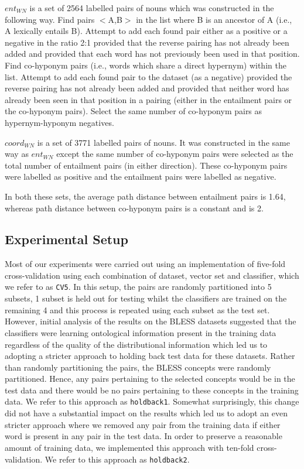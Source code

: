 \documentclass[11pt]{article}
\begin{document}
$ent_{WN}$ is a set of 2564 labelled pairs of nouns which was constructed in the following way.  Find pairs $<$A,B$>$ in the list where B is an ancestor of A (i.e., A lexically entails B).  Attempt to add each found pair either as a positive or a negative in the ratio 2:1 provided that the reverse pairing has not already been added and provided that each word has not previously been used in that position.  Find co-hyponym pairs (i.e., words which share a direct hypernym) within the list.  Attempt to add each found pair to the dataset (as a negative) provided the reverse pairing has not already been added and provided that neither word has already been seen in that position in a pairing (either in the entailment pairs or the co-hyponym pairs).  Select the same number of co-hyponym pairs as hypernym-hyponym negatives. 

$coord_{WN}$ is a set of 3771 labelled pairs of nouns.  It was constructed in the same way as $ent_{WN}$ except the same number of co-hyponym pairs were selected as the total number of entailment pairs (in either direction).  These co-hyponym pairs were labelled as positive and the entailment pairs were labelled as negative.

In both these sets, the average path distance between entailment pairs is 1.64, whereas path distance between co-hyponym pairs is a constant and is 2.

\subsection{Experimental Setup}

Most of our experiments were carried out using an implementation of five-fold cross-validation using each combination of dataset, vector set and classifier, which we refer to as \texttt{CV5}.  In this setup, the pairs are randomly partitioned into 5 subsets, 1 subset is held out for testing whilst the classifiers are trained on the remaining 4 and this process is repeated using each subset as the test set.  However, initial analysis of the results on the BLESS datasets suggested that the classifiers were learning ontological information present in the training data regardless of the quality of the distributional information which led us to adopting a stricter approach to holding back test data for these datasets.  Rather than randomly partitioning the pairs, the BLESS concepts were randomly partitioned.  Hence, any pairs pertaining to the selected concepts would be in the test data and there would be no pairs pertaining to these concepts in the training data.  We refer to this approach as \texttt{holdback1}.  Somewhat surprisingly, this change did not have a substantial impact on the results which led us to adopt an even stricter approach where we removed any pair from the training data if either word is present in any pair in the test data.  In order to preserve a reasonable amount of training data, we implemented this approach with ten-fold cross-validation.  We refer to this approach as \texttt{holdback2}.
\end{document}
